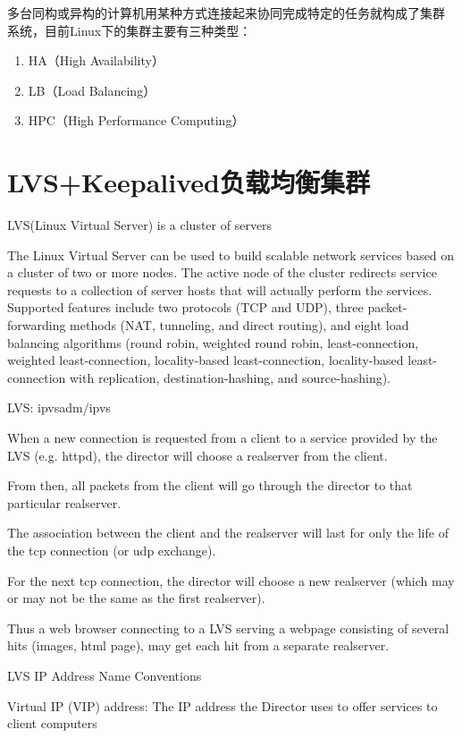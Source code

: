 多台同构或异构的计算机用某种方式连接起来协同完成特定的任务就构成了集群
系统，目前Linux下的集群主要有三种类型：

\begin{enumerate}[itemsep=0pt,parsep=0pt]
\item HA（High Availability）
\item LB（Load Balancing）
\item HPC（High Performance Computing）
\end{enumerate}

\chapter{LVS+Keepalived负载均衡集群}

LVS(Linux Virtual Server) is a cluster of servers 

The Linux Virtual Server can be used to build scalable network
services based on a cluster of two or more nodes. The active node of
the cluster redirects service requests to a collection of server hosts
that will actually perform the services. Supported features include
two protocols (TCP and UDP), three packet-forwarding methods (NAT,
tunneling, and direct routing), and eight load balancing algorithms
(round robin, weighted round robin, least-connection, weighted
least-connection, locality-based least-connection, locality-based
least-connection with replication, destination-hashing, and
source-hashing).

LVS: ipvsadm/ipvs

When a new connection is requested from a client to a service provided
by the LVS (e.g. httpd), the director will choose a realserver from
the client.

From then, all packets from the client will go through the director to
that particular realserver.

The association between the client and the realserver will last for
only the life of the tcp connection (or udp exchange).

For the next tcp connection, the director will choose a new realserver
(which may or may not be the same as the first realserver).

Thus a web browser connecting to a LVS serving a webpage consisting of
several hits (images, html page), may get each hit from a separate
realserver.

LVS IP Address Name Conventions

Virtual IP (VIP) address: The IP address the Director uses to offer
services to client computers


